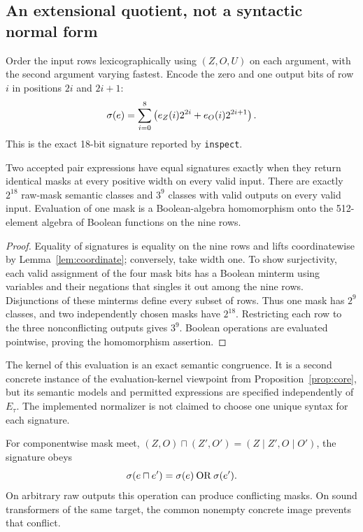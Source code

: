 \subsection{An extensional quotient, not a syntactic normal form}
Order the input rows lexicographically using $(Z,O,U)$ on each argument, with the second argument varying fastest. Encode the zero and one output bits of row $i$ in positions $2i$ and $2i+1$:
\[
\sigma(e)=\sum_{i=0}^{8}\left(e_Z(i)2^{2i}+e_O(i)2^{2i+1}\right).
\]
This is the exact 18-bit signature reported by \texttt{inspect}.

\begin{theorem}\label{thm:signature}
Two accepted pair expressions have equal signatures exactly when they return identical masks at every positive width on every valid input. There are exactly $2^{18}$ raw-mask semantic classes and $3^9$ classes with valid outputs on every valid input. Evaluation of one mask is a Boolean-algebra homomorphism onto the 512-element algebra of Boolean functions on the nine rows.
\end{theorem}
\begin{proof}
Equality of signatures is equality on the nine rows and lifts coordinatewise by Lemma~\ref{lem:coordinate}; conversely, take width one. To show surjectivity, each valid assignment of the four mask bits has a Boolean minterm using variables and their negations that singles it out among the nine rows. Disjunctions of these minterms define every subset of rows. Thus one mask has $2^9$ classes, and two independently chosen masks have $2^{18}$. Restricting each row to the three nonconflicting outputs gives $3^9$. Boolean operations are evaluated pointwise, proving the homomorphism assertion.
\end{proof}

The kernel of this evaluation is an exact semantic congruence. It is a second concrete instance of the evaluation-kernel viewpoint from Proposition~\ref{prop:core}, but its semantic models and permitted expressions are specified independently of $E_\tau$. The implemented normalizer is not claimed to choose one unique syntax for each signature.

For componentwise mask meet, $(Z,O)\sqcap(Z',O')=(Z\mathbin{|}Z',O\mathbin{|}O')$, the signature obeys
\begin{equation}\label{eq:meet}
\sigma(e\sqcap e')=\sigma(e)\mathbin{\mathrm{OR}}\sigma(e').
\end{equation}
On arbitrary raw outputs this operation can produce conflicting masks. On sound transformers of the same target, the common nonempty concrete image prevents that conflict.

